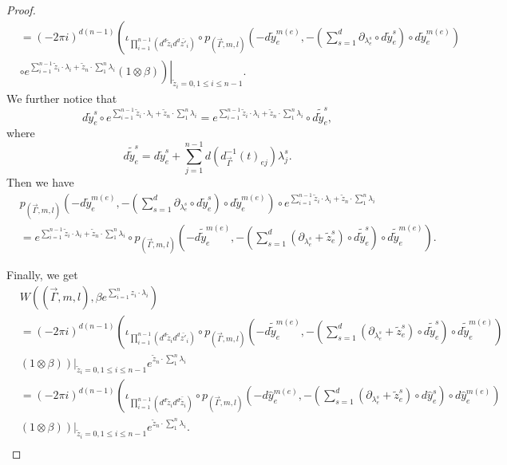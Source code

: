 \documentclass[11pt]{amsart}
\theoremstyle{definition}
\theoremstyle{remark}
\numberwithin{equation}{section}
\begin{document}
\begin{proof}
\begin{align*}
        &=(-2\pi i)^{d(n-1)}\left(
        \iota_{\prod_{i=1}^{n-1}(d^{d}\tilde{z}_{i}d^{d}\bar{z'}_{i})}\circ p_{(\vec{\Gamma},m,l)}(-d\tilde{y}_{e}^{m(e)},-(\sum_{s=1}^{d}\partial_{\lambda_{e}^{s}}\circ d\tilde{y}_{e}^{s})\circ d\tilde{y}_{e}^{m(e)})
        \right.\\
        &\left.\left.\circ e^{\sum_{i=1}^{n-1}\tilde{z}_{i}\cdot\lambda_{i}+\tilde{z}_{n}\cdot\sum_{1}^{n}\lambda_{i}}(1\otimes \beta)\right)\right|_{\tilde{z}_{i}=0,1\leq i\leq n-1}.
    \end{align*}
    We further notice that
    $$
    d\tilde{y}_{e}^{s}\circ e^{\sum_{i=1}^{n-1}\tilde{z}_{i}\cdot\lambda_{i}+\tilde{z}_{n}\cdot\sum_{1}^{n}\lambda_{i}}=e^{\sum_{i=1}^{n-1}\tilde{z}_{i}\cdot\lambda_{i}+\tilde{z}_{n}\cdot\sum_{1}^{n}\lambda_{i}}\circ d\tilde{\tilde{y}}_{e}^{s},
    $$
    where 
    $$
    d\tilde{\tilde{y}}_{e}^{s}=d\tilde{y}_{e}^{s}+\sum_{j=1}^{n-1}d\left(d^{-1}_{\vec{\Gamma}}(t)_{ej}\right)\lambda_{j}^{s}.
    $$
    Then we have
    \begin{align*}
        &p_{(\vec{\Gamma},m,l)}(-d\tilde{y}_{e}^{m(e)},-(\sum_{s=1}^{d}\partial_{\lambda_{e}^{s}}\circ d\tilde{y}_{e}^{s})\circ d\tilde{y}_{e}^{m(e)})\circ e^{\sum_{i=1}^{n-1}\tilde{z}_{i}\cdot\lambda_{i}+\tilde{z}_{n}\cdot\sum_{1}^{n}\lambda_{i}}\\
        &=e^{\sum_{i=1}^{n-1}\tilde{z}_{i}\cdot\lambda_{i}+\tilde{z}_{n}\cdot\sum_{1}^{n}\lambda_{i}}\circ p_{(\vec{\Gamma},m,l)}(-d\tilde{\tilde{y}}_{e}^{m(e)},-(\sum_{s=1}^{d}(\partial_{\lambda_{e}^{s}}+\tilde{z}_{e}^{s})\circ d\tilde{\tilde{y}}_{e}^{s})\circ d\tilde{\tilde{y}}_{e}^{m(e)}).
    \end{align*}

    Finally, we get
    \begin{align*}
        &W((\vec{\Gamma},m,l),\beta e^{\sum_{i=1}^{n}z_{i}\cdot\lambda_{i}})\\
        &=(-2\pi i)^{d(n-1)}\left(
        \iota_{\prod_{i=1}^{n-1}(d^{d}\tilde{z}_{i}d^{d}\bar{z'}_{i})}\circ p_{(\vec{\Gamma},m,l)}(-d\tilde{\tilde{y}}_{e}^{m(e)},-(\sum_{s=1}^{d}(\partial_{\lambda_{e}^{s}}+\tilde{z}_{e}^{s})\circ d\tilde{\tilde{y}}_{e}^{s})\circ d\tilde{\tilde{y}}_{e}^{m(e)})
        \right.\\
        &\left.\left.(1\otimes \beta)\right)\right|_{\tilde{z}_{i}=0,1\leq i\leq n-1} e^{\tilde{z}_{n}\cdot\sum_{1}^{n}\lambda_{i}}\\
        &=(-2\pi i)^{d(n-1)}\left(
        \iota_{\prod_{i=1}^{n-1}(d^{d}\tilde{z}_{i}d^{d}\bar{\tilde{z}}_{i})}\circ p_{(\vec{\Gamma},m,l)}(-d\hat{y}_{e}^{m(e)},-(\sum_{s=1}^{d}(\partial_{\lambda_{e}^{s}}+\tilde{z}_{e}^{s})\circ d\hat{y}_{e}^{s})\circ d\hat{y}_{e}^{m(e)})
        \right.\\
        &\left.\left.(1\otimes \beta)\right)\right|_{\tilde{z}_{i}=0,1\leq i\leq n-1} e^{\tilde{z}_{n}\cdot\sum_{1}^{n}\lambda_{i}}.\\
    \end{align*}
\end{proof}
\end{document}
